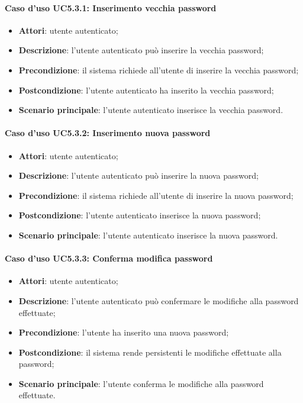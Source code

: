\paragraph{Caso d'uso UC5.3.1: Inserimento vecchia password}

\begin{itemize}
	\item \textbf{Attori}: utente autenticato;
	\item \textbf{Descrizione}: l'utente autenticato può inserire la vecchia password;
	\item \textbf{Precondizione}: il sistema richiede all'utente di inserire la vecchia password;
	\item \textbf{Postcondizione}: l'utente autenticato ha inserito la vecchia password;
	\item \textbf{Scenario principale}: l'utente autenticato inserisce la vecchia password.
\end{itemize}

\paragraph{Caso d'uso UC5.3.2: Inserimento nuova password}

\begin{itemize}
	\item \textbf{Attori}: utente autenticato;
	\item \textbf{Descrizione}: l'utente autenticato può inserire la nuova password;
	\item \textbf{Precondizione}: il sistema richiede all'utente di inserire la nuova password;
	\item \textbf{Postcondizione}: l'utente autenticato inserisce la nuova password;
	\item \textbf{Scenario principale}: l'utente autenticato inserisce la nuova password.
\end{itemize}

\paragraph{Caso d'uso UC5.3.3: Conferma modifica password}

\begin{itemize}
	\item \textbf{Attori}: utente autenticato;
	\item \textbf{Descrizione}: l'utente autenticato può confermare le modifiche alla password effettuate;
	\item \textbf{Precondizione}: l'utente ha inserito una nuova password;
	\item \textbf{Postcondizione}: il sistema rende persistenti le modifiche effettuate alla password;
	\item \textbf{Scenario principale}: l'utente conferma le modifiche alla password effettuate.
\end{itemize}

